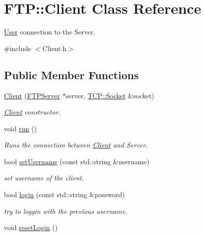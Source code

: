 \hypertarget{classFTP_1_1Client}{}\section{F\+T\+P\+:\+:Client Class Reference}
\label{classFTP_1_1Client}


\hyperlink{structFTP_1_1User}{User} connection to the Server.  




{\ttfamily \#include $<$Client.\+h$>$}

\subsection*{Public Member Functions}
\begin{DoxyCompactItemize}
\item 
\hyperlink{classFTP_1_1Client_ab611529ac304de5e847df898306b7408}{Client} (\hyperlink{classFTP_1_1FTPServer}{F\+T\+P\+Server} $\ast$server, \hyperlink{classFTP_1_1TCP_1_1Socket}{T\+C\+P\+::\+Socket} \&socket)
\begin{DoxyCompactList}\small\item\em \hyperlink{classFTP_1_1Client}{Client} constructor. \end{DoxyCompactList}\item 
void \hyperlink{classFTP_1_1Client_a260407a0f8d8fe5c7c26b68b5ac2443b}{run} ()
\begin{DoxyCompactList}\small\item\em Runs the connection between \hyperlink{classFTP_1_1Client}{Client} and Server. \end{DoxyCompactList}\item 
\hypertarget{classFTP_1_1Client_a5423cfaf6fc6242ad010c8605df143df}{}bool \hyperlink{classFTP_1_1Client_a5423cfaf6fc6242ad010c8605df143df}{set\+Username} (const std\+::string \&username)\label{classFTP_1_1Client_a5423cfaf6fc6242ad010c8605df143df}

\begin{DoxyCompactList}\small\item\em set username of the client. \end{DoxyCompactList}\item 
bool \hyperlink{classFTP_1_1Client_abfdc9020e33df97a728211b81097113f}{login} (const std\+::string \&password)
\begin{DoxyCompactList}\small\item\em try to loggin with the previous username. \end{DoxyCompactList}\item 
\hypertarget{classFTP_1_1Client_a9d09db3246bb37ee6cd1cb48ae48ec67}{}void \hyperlink{classFTP_1_1Client_a9d09db3246bb37ee6cd1cb48ae48ec67}{reset\+Login} ()\label{classFTP_1_1Client_a9d09db3246bb37ee6cd1cb48ae48ec67}


\end{DoxyCompactItemize}
